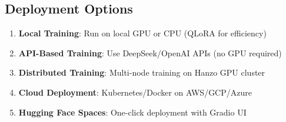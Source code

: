 \subsection{Deployment Options}

\begin{enumerate}
    \item \textbf{Local Training}: Run on local GPU or CPU (QLoRA for efficiency)
    \item \textbf{API-Based Training}: Use DeepSeek/OpenAI APIs (no GPU required)
    \item \textbf{Distributed Training}: Multi-node training on Hanzo GPU cluster
    \item \textbf{Cloud Deployment}: Kubernetes/Docker on AWS/GCP/Azure
    \item \textbf{Hugging Face Spaces}: One-click deployment with Gradio UI
\end{enumerate}

